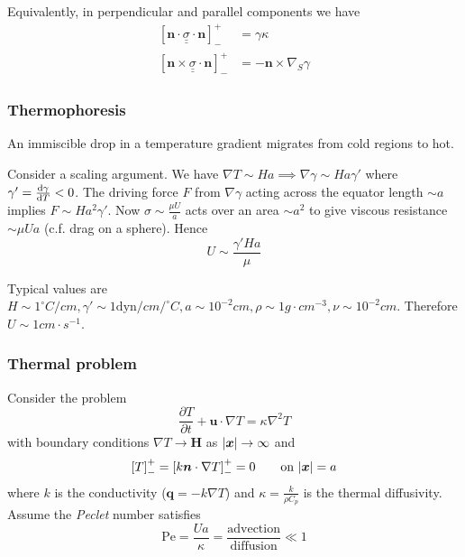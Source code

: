 \documentclass{jknotes}
\newcommand{\dunder}[1]{\underline{\underline{#1}}}
\newcommand{\x}{\bm{x}}
\renewcommand{\u}{\bm{u}}
\begin{document}
Equivalently, in perpendicular and parallel components we have
\begin{align}
	\left[ \bm{n} \cdot \dunder{\sigma} \cdot \bm{n}\right]^+_- &= \gamma
	\kappa \\
	\left[ \bm{n} \times \dunder{\sigma} \cdot \bm{n}\right]^+_- &= -\bm{n}
	\times \nabla_S \gamma
\end{align}

\subsubsection{Thermophoresis}
An immiscible drop in a temperature gradient migrates from cold regions to
hot.

\begin{center}
\end{center}

Consider a scaling argument.  We have $\nabla T \sim H a \implies \nabla
\gamma \sim H a \gamma'$ where $\gamma' = \frac{\diffd \gamma}{\diffd T} < 0$.
The driving force $F$ from $\nabla \gamma$ acting across the equator length
$\sim a$ implies $F \sim H a^2 \gamma'$. Now $\sigma \sim \frac{\mu U}{a}$
acts over an area $\sim a^2$ to give viscous resistance $\sim \mu U a$ (c.f.
drag on a sphere). Hence
\begin{equation}
	U \sim \frac{\gamma' H a}{\mu}
\end{equation}

Typical values are $H \sim 1^{\circ} C/cm, \gamma' \sim 1
\text{dyn}/cm/^{\circ} C, a \sim 10^{-2} cm, \rho \sim 1 g \cdot cm^{-3}, \nu
\sim 10^{-2} cm$. Therefore $U \sim 1 cm\cdot s^{-1}$.

\subsubsection{Thermal problem}
Consider the problem
\begin{equation}
	\frac{\partial T}{\partial t} + \u \cdot \nabla T = \kappa \nabla^2 T
\end{equation}
with boundary conditions $\nabla T \to \bm{H}$ as $\abs{\x} \to \infty$ and
\begin{equation}
	\left[ T\right]^+_- = \left[ k \bm{n} \cdot \nabla T\right]^+_- = 0
	\hspace{2em} \text{on} \,\, \abs{\x} = a
\end{equation}
where $k$ is the conductivity ($\bm{q} = -k \nabla T$) and $\kappa =
\frac{k}{\rho C_p}$ is the thermal diffusivity. Assume the \emph{Peclet}
number satisfies
\begin{equation}
	\text{Pe} = \frac{U a}{\kappa} = \frac{\text{advection}}{\text{diffusion}}
	\ll 1
\end{equation}
\end{document}
